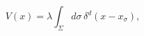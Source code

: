 \begin{equation}
V(x)=\lambda\int_\Sigma d\sigma\, \delta^d(x-x_\sigma), \label{2.1}
\end{equation}

